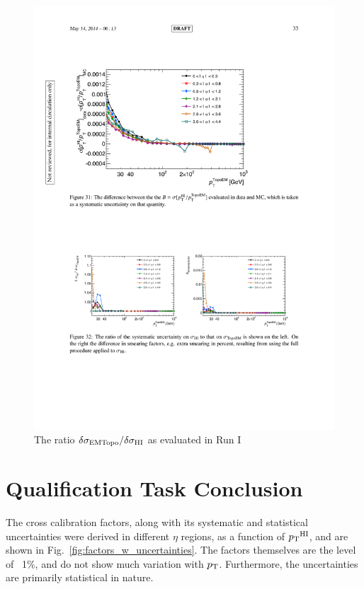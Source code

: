     \begin{figure}
        \centering
        \includegraphics[width=1\textwidth]{figures/qualification/run1_jer_uncert}
		\caption{The ratio $\delta\sigma_{\text{EMTopo}} / \delta\sigma_{\mathrm{HI}}$ as evaluated in Run I \cite{xcalib_run1}}
		\label{fig:run1_jer_uncert}
\end{figure}



\section{Qualification Task Conclusion}
\label{sec:qual_result}
The cross calibration factors, along with its systematic and statistical uncertainties were derived in different $\eta$ regions, as a function of $\mbox{$p_{\mathrm{T}}$}^{\mathrm{HI}}$, and are shown in Fig.~\ref{fig:factors_w_uncertainties}. The factors themselves are the level of ~1\%, and do not show much variation with $\mbox{$p_{\mathrm{T}}$}$.  Furthermore, the uncertainties are primarily statistical in nature. 



